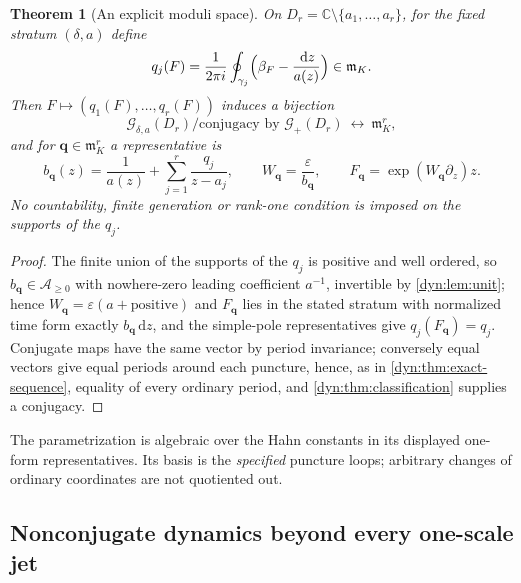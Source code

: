 \documentclass[11pt,letterpaper]{article}
\newtheorem{theorem}{Theorem}[section]
\theoremstyle{definition}
\theoremstyle{remark}
\newcommand{\C}{\mathbb C}
\newcommand{\GG}{\mathscr G}
\newcommand{\AAA}{\mathscr A}
\newcommand{\m}{\mathfrak m}
\newcommand{\eps}{\varepsilon}
\newcommand{\dd}{\,\mathrm d}
\numberwithin{equation}{section}
\begin{document}
\begin{theorem}[An explicit moduli space]\label{dyn:thm:moduli}
On $D_r=\C\setminus\{a_1,\dots,a_r\}$, for the fixed stratum
$(\delta,a)$ define
\begin{equation}\label{dyn:eq:moduli-map}
 q_j(F)=\frac1{2\pi i}\oint_{\gamma_j}
 \Bigl(\beta_F-\frac{\dd z}{a(z)}\Bigr)\in\m_K .
\end{equation}
Then $F\mapsto(q_1(F),\dots,q_r(F))$ induces a \emph{bijection}
\begin{equation}\label{dyn:eq:moduli-bijection}
 \GG_{\delta,a}(D_r)/\text{conjugacy by }\GG_+(D_r)
 \ \longleftrightarrow\ \m_K^{r},
\end{equation}
and for $\mathbf q\in\m_K^{r}$ a representative is
\begin{equation}\label{dyn:eq:moduli-representative}
 b_{\mathbf q}(z)=\frac1{a(z)}+\sum_{j=1}^{r}\frac{q_j}{z-a_j},
 \qquad W_{\mathbf q}=\frac{\eps}{b_{\mathbf q}},
 \qquad F_{\mathbf q}=\exp(W_{\mathbf q}\partial_z)z .
\end{equation}
No countability, finite generation or rank-one condition is imposed on the
supports of the $q_j$.
\end{theorem}
\begin{proof}
The finite union of the supports of the $q_j$ is positive and well ordered,
so $b_{\mathbf q}\in\AAA_{\ge0}$ with nowhere-zero leading coefficient
$a^{-1}$, invertible by \cref{dyn:lem:unit}; hence
$W_{\mathbf q}=\eps(a+\text{positive})$ and $F_{\mathbf q}$ lies in the
stated stratum with normalized time form exactly $b_{\mathbf q}\dd z$, and
the simple-pole representatives give $q_j(F_{\mathbf q})=q_j$. Conjugate
maps have the same vector by period invariance; conversely equal vectors
give equal periods around each puncture, hence, as in
\cref{dyn:thm:exact-sequence}, equality of every ordinary period, and
\cref{dyn:thm:classification} supplies a conjugacy.
\end{proof}

The parametrization is algebraic over the Hahn constants in its displayed
one-form representatives. Its basis is the \emph{specified} puncture loops;
arbitrary changes of ordinary coordinates are not quotiented out.

\subsection{Nonconjugate dynamics beyond every one-scale jet}
\label{dyn:subsec:flat}
\end{document}
